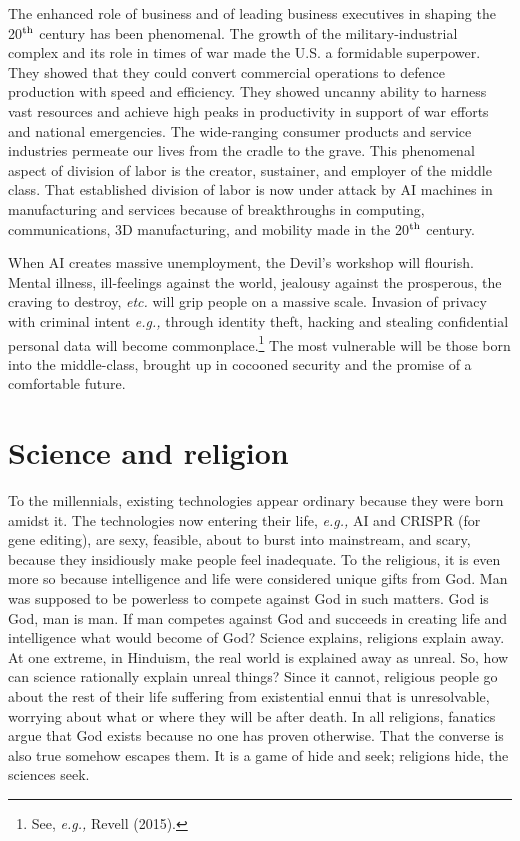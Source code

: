 \begin{multicols}{2}
The enhanced role of business and of leading business executives in shaping the 20$^{\rm th}$ century has been phenomenal. The growth of the military-industrial complex and its role in times of war made the U.S. a formidable superpower. They showed that they could convert commercial operations to defence production with speed and efficiency. They showed uncanny ability to harness vast resources and achieve high peaks in productivity in support of war efforts and national emergencies. The wide-ranging consumer products and service industries permeate our lives from the cradle to the grave. This phenomenal aspect of division of labor is the creator, sustainer, and employer of the middle class. That established division of labor is now under attack by AI machines in manufacturing and services because of breakthroughs in computing, communications, 3D manufacturing, and mobility made in the 20$^{\rm th}$ century.

When AI creates massive unemployment, the Devil's workshop will flourish. Mental illness, ill-feelings against the world, jealousy against the prosperous, the craving to destroy, \textit{etc.} will grip people on a massive scale. Invasion of privacy with criminal intent \textit{e.g.,} through identity theft, hacking and stealing confidential personal data will become commonplace.\footnote{See, \textit{e.g.,} Revell (2015).}  The most vulnerable will be those born into the middle-class, brought up in cocooned security and the promise of a comfortable future.

\section{Science and religion}

To the millennials, existing technologies appear ordinary because they were born amidst it. The technologies now entering their life, \textit{e.g.,} AI and CRISPR (for gene editing), are sexy, feasible, about to burst into mainstream, and scary, because they insidiously make people feel inadequate. To the religious, it is even more so because intelligence and life were considered unique gifts from God. Man was supposed to be powerless to compete against God in such matters. God is God, man is man. If man competes against God and succeeds in creating life and intelligence what would become of God? Science explains, religions explain away. At one extreme, in Hinduism, the real world is explained away as unreal. So, how can science rationally explain unreal things? Since it cannot, religious people go about the rest of their life suffering from existential ennui that is unresolvable, worrying about what or where they will be after death. In all religions, fanatics argue that God exists because no one has proven otherwise. That the converse is also true somehow escapes them. It is a game of hide and seek; religions hide, the sciences seek.


\end{multicols}
